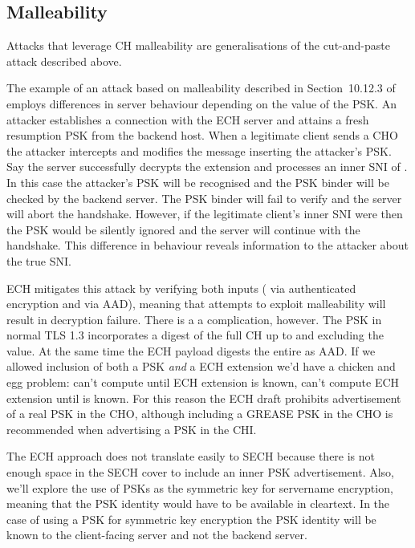 

\subsection{ Malleability}
Attacks that leverage \ac{CH} malleability are generalisations of the cut-and-paste attack
described above.

The example of an attack based on  malleability described in Section~10.12.3 of \cite{esni}
employs differences in server behaviour depending on the value of the \ac{PSK}.
An attacker establishes a connection
with the \ac{ECH} server and attains a fresh resumption \ac{PSK} from the backend  host.
When a legitimate client sends a \ac{CHO}
the attacker intercepts and modifies the message inserting the attacker's \ac{PSK}.
Say the server successfully decrypts the \varech extension and processes an inner \ac{SNI} of .
In this case the attacker's \ac{PSK} will be recognised and the \ac{PSK} binder will be checked
by the backend server.
The \ac{PSK} binder will fail to verify and the server will
abort the handshake.
However, if the legitimate client's inner \ac{SNI} were  then the \ac{PSK} would be silently
ignored and the server will continue with the handshake.
This difference in behaviour reveals information to the attacker about
the true \ac{SNI}.

\ac{ECH} mitigates this attack by verifying both inputs ( via authenticated encryption and  via \ac{AAD}),
meaning that attempts to exploit malleability will result in decryption failure.
There is a a complication, however.
The \ac{PSK}  in normal \ac{TLS} 1.3 incorporates a digest of the full
\ac{CH} up to and excluding the  value.
At the same time the \ac{ECH} payload
digests the entire  as \ac{AAD}.
If we allowed inclusion of both a \ac{PSK}  {\em and}
a \ac{ECH} extension we'd have a chicken and egg problem: can't compute  until \ac{ECH} extension is known, can't
compute \ac{ECH} extension until  is known.
For this reason the \ac{ECH} draft prohibits
advertisement of a real \ac{PSK} in the \ac{CHO},
although including a \ac{GREASE} \ac{PSK} in the \ac{CHO}
is recommended when advertising a \ac{PSK} in the \ac{CHI}.

The \ac{ECH} approach does not translate easily to \ac{SECH} because there is not enough
space in the \ac{SECH} cover to include an inner \ac{PSK} advertisement.
Also, we'll explore the use of \ac{PSK}s as the symmetric key for servername encryption,
meaning that the \ac{PSK} identity would have to be available in cleartext.
In the case of using a \ac{PSK} for symmetric key encryption the \ac{PSK} identity will be known
to the client-facing server and not the backend server.

